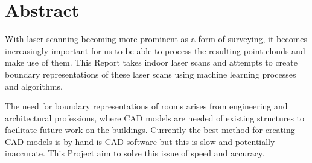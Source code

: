 \chapter*{Abstract}


	With laser scanning becoming more prominent as a form of surveying, it becomes increasingly important for us to be able to process the resulting point clouds and make use of them. This Report takes indoor laser scans and attempts to create boundary representations of these laser scans using machine learning processes and algorithms.
	
	The need for boundary representations of rooms arises from engineering and architectural professions, where CAD models are needed of existing structures to facilitate future work on the buildings. Currently the best method for creating CAD models is by hand is CAD software but this is slow and potentially inaccurate. This Project aim to solve this issue of speed and accuracy.